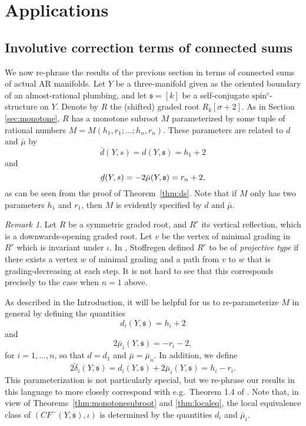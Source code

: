 \documentclass[11 pt]{amsart}
\theoremstyle{remark}
\newtheorem {remark}[theorem]{Remark}
\def\spinc {{\operatorname{spin^c}}}
\def\s{\mathfrak s}
\newcommand{\bunderline}[1]{\underline{#1\mkern-2mu}\mkern2mu }
\def\du {\bar{d}}
\def\dl {\bunderline{d}}
\def\CF {\mathit{CF}}
\newcommand \CFm {\CF^-}
\def\inv{\iota}
\def\tdelta{\tilde\delta}
\begin{document}


\section{Applications}
\label{sec:app}

\subsection{Involutive correction terms of connected sums} 
\label{sec:dssums}
We now re-phrase the results of the previous section in terms of connected sums of actual AR manifolds. Let $Y$ be a three-manifold given as the oriented boundary of an almost-rational plumbing, and let $\s = [k]$ be a self-conjugate $\spinc$-structure on $Y$. Denote by $R$ the (shifted) graded root $R_k[\sigma + 2]$. As in Section \ref{sec:monotone}, $R$ has a monotone subroot $M$ parameterized by some tuple of rational numbers $M = M(h_1, r_1; \ldots; h_n, r_n)$. These parameters are related to $d$ and $\bar{\mu}$ by
\[
\du(Y, s) = d(Y, \s) = h_1 + 2
\]
and
\[
\dl(Y, s) = -2\bar{\mu}(Y, \s) = r_n + 2,
\]
as can be seen from the proof of Theorem~\ref{thm:ds}. Note that if $M$ only has two parameters $h_1$ and $r_1$, then $M$ is evidently specified by $d$ and $\bar{\mu}$. 

\begin{remark}
Let $R$ be a symmetric graded root, and $R^r$ its vertical reflection, which is a downwards-opening graded root. Let $v$ be the vertex of minimal grading in $R^r$ which is invariant under $\inv$. In \cite[Section 5.2]{Stoffregen}, Stoffregen defined $R^r$ to be of \textit{projective type} if there exists a vertex $w$ of minimal grading and a path from $v$ to $w$ that is grading-decreasing at each step. It is not hard to see that this corresponds precisely to the case when $n = 1$ above.
\end{remark}

As described in the Introduction, it will be helpful for us to re-parameterize $M$ in general by defining the quantities 
\[
d_i(Y, \s) = h_i + 2
\] 
and
\[
2\bar{\mu}_i(Y, \s) = - r_i - 2,
\]
for $i = 1, \ldots, n$, so that $d = d_1$ and $\bar{\mu} = \bar{\mu}_n$. In addition, we define
\[
2\tdelta_i(Y, \s) = d_i(Y, \s) + 2\bar \mu_i(Y, \s) = h_i - r_i.
\]
This parameterization is not particularly special, but we re-phrase our results in this language to more closely correspond with e.g.\ Theorem 1.4 of \cite{Stoffregen2}. Note that, in view of Theorems~\ref{thm:monotonesubroot} and \ref{thm:localeq}, the local equivalence class of $(\CFm(Y, \s), \inv)$ is determined by the quantities $d_i$ and $\bar \mu_i$.
\end{document}
